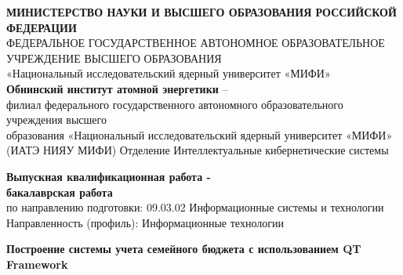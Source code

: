 \documentclass[a4paper,12pt]{article}
\begin{document}

\renewcommand{\refname}{\centerline{СПИСОК ИСПОЛЬЗОВАННОЙ ЛИТЕРАТУРЫ}} 
\renewcommand{\contentsname}{\centerline{СОДЕРЖАНИЕ}} 

\thispagestyle{empty}
\begin{center} \small
 
\textbf{МИНИСТЕРСТВО НАУКИ И ВЫСШЕГО ОБРАЗОВАНИЯ РОССИЙСКОЙ ФЕДЕРАЦИИ}\\
ФЕДЕРАЛЬНОЕ ГОСУДАРСТВЕННОЕ АВТОНОМНОЕ ОБРАЗОВАТЕЛЬНОЕ УЧРЕЖДЕНИЕ ВЫСШЕГО ОБРАЗОВАНИЯ\\
«Национальный исследовательский ядерный университет «МИФИ»\\
\textbf{Обнинский институт атомной энергетики} – \\
филиал федерального государственного автономного образовательного учреждения высшего\\
образования «Национальный исследовательский ядерный университет «МИФИ»\\
(ИАТЭ НИЯУ МИФИ)
Отделение Интеллектуальные кибернетические системы
\end{center}

\begin{center}
\textbf{\Large Выпускная квалификационная работа -\\ бакалаврская работа} \\
	по направлению подготовки: 09.03.02 Информационные системы и технологии\\	
	Направленность (профиль): Информационные технологии
	\medskip
	
	\textbf{\Large 
		Построение системы учета семейного бюджета с использованием QT Framework
	}
	
\end{center}

\vspace{1cm}
\end{document}
